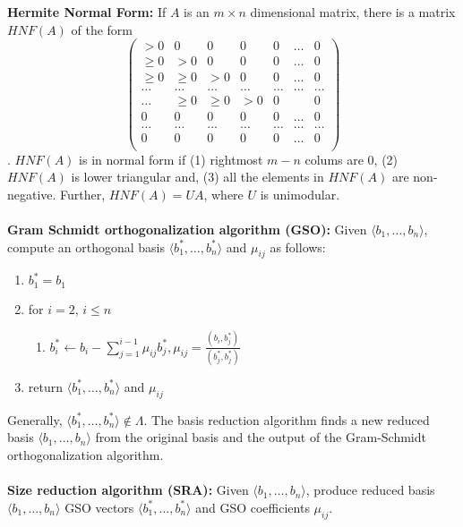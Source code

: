 {\bf Hermite Normal Form: } If $A$ is an $m \times n$ dimensional matrix, there is a matrix $HNF(A)$ of the form
$$
\left(
\begin{array}{ccccccc}
>0 & 0 & 0 & 0 & 0 & \ldots & 0\\
\geq 0 & >0 & 0 & 0  & 0 &  \ldots & 0\\
\geq 0 &\geq 0 & >0 & 0  & 0 &  \ldots & 0\\
\ldots & \ldots & \ldots & \ldots & \ldots & \ldots & \ldots \\
\ldots &\geq 0 &\geq 0 & >0 &  0 & &  0\\
0 & 0 & 0 & 0 & 0 & \ldots & 0\\
\ldots & \ldots & \ldots & \ldots & \ldots & \ldots & \ldots \\
0 & 0 & 0 & 0 & 0 & \ldots & 0\\
\end{array}
\right) 
$$. $HNF(A)$ is in normal form if (1) rightmost $m-n$ colums are $0$, (2) $HNF(A)$ is lower triangular and,
(3) all the elements in $HNF(A)$ are non-negative.
Further, $HNF(A) = U A$, where $U$ is unimodular.
\\
\\
{\bf Gram Schmidt orthogonalization algorithm (GSO): } Given $\langle b_1 , \ldots , b_n \rangle$,
compute an orthogonal basis $\langle b_1^* , \ldots , b_n^* \rangle$ and $\mu_{ij}$ as follows:
\begin{enumerate}
\item $b_1^* = b_1$
\item for $i = 2$, $i \leq n$
\begin{enumerate}[label*=\arabic*.]
\item $b_i^* \leftarrow b_i - \sum_{j=1}^{i-1} \mu_{ij} b_j^* , \mu_{ij} = {\frac {(b_i, b_j^*)} {(b_j^*, b_j^*)}}$
\end{enumerate}
\item return $\langle b_1^* , \ldots , b_n^* \rangle$ and $\mu_{ij}$ 
\end{enumerate}
Generally, $\langle b_1^* , \ldots , b_n^* \rangle \notin \Lambda$.  The basis reduction
algorithm finds a new reduced basis $\langle b_1 , \ldots , b_n \rangle$ from the original
basis and the output of the Gram-Schmidt orthogonalization algorithm.
\\
\\
{\bf Size reduction algorithm (SRA): } Given $\langle b_1 , \ldots , b_n \rangle$,
produce reduced basis $\langle b_1 , \ldots , b_n \rangle$ GSO vectors
$\langle b_1^* , \ldots , b_n^* \rangle$ and GSO coefficients $\mu_{ij}$.
